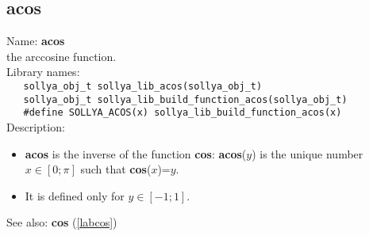 \subsection{acos}
\label{labacos}
\noindent Name: \textbf{acos}\\
\phantom{aaa}the arccosine function.\\[0.2cm]
\noindent Library names:\\
\verb|   sollya_obj_t sollya_lib_acos(sollya_obj_t)|\\
\verb|   sollya_obj_t sollya_lib_build_function_acos(sollya_obj_t)|\\
\verb|   #define SOLLYA_ACOS(x) sollya_lib_build_function_acos(x)|\\[0.2cm]
\noindent Description: \begin{itemize}

\item \textbf{acos} is the inverse of the function \textbf{cos}: \textbf{acos}($y$) is the unique number 
   $x \in [0; \pi]$ such that \textbf{cos}($x$)=$y$.

\item It is defined only for $y \in [-1;1]$.
\end{itemize}
See also: \textbf{cos} (\ref{labcos})
